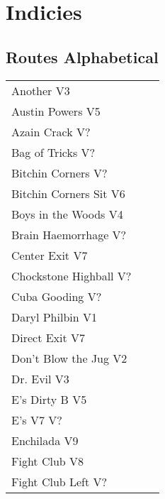\chapter{Indicies}
\section{Routes Alphabetical}
\begin{center}
\begin{supertabular}{llr}
Another V3&  & \pageref{rt:Another} \\
Austin Powers V5&  & \pageref{rt:Austin Powers} \\
Azain Crack V?&& \pageref{rt:Azain Crack} \\
Bag of Tricks V?&& \pageref{rt:Bag of Tricks} \\
Bitchin Corners V?&& \pageref{rt:Bitchin Corners} \\
Bitchin Corners Sit V6&& \pageref{vr:Bitchin Corners Sit} \\
Boys in the Woods V4&   & \pageref{rt:Boys in the Woods} \\
Brain Haemorrhage V?&& \pageref{rt:Brain Haemorrhage} \\
Center Exit V7&    & \pageref{vr:Center Exit} \\
Chockstone Highball V?&& \pageref{rt:Chockstone Highball} \\
Cuba Gooding V?&& \pageref{rt:Cuba Gooding} \\
Daryl Philbin V1&    & \pageref{rt:Daryl Philbin} \\
Direct Exit V7&     & \pageref{vr:Direct Exit} \\
Don't Blow the Jug V2&& \pageref{rt:Don't Blow the Jug} \\
Dr. Evil V3&  & \pageref{rt:Dr. Evil} \\
E's Dirty B V5&   & \pageref{rt:E's Dirty B} \\
E's V7 V?&& \pageref{rt:E's V7} \\
Enchilada V9&   & \pageref{rt:Enchilada} \\
Fight Club V8&    & \pageref{rt:Fight Club} \\
Fight Club Left V?&& \pageref{rt:Fight Club Left} \\

\end{supertabular}
\end{center}
